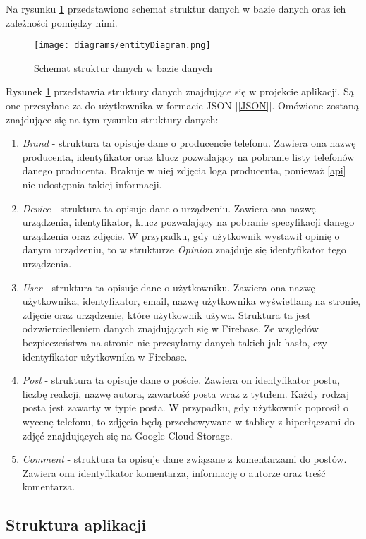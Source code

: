 Na rysunku \ref{database} przedstawiono schemat struktur danych w bazie danych oraz ich zależności pomiędzy nimi.

\begin{figure}[H]
    \centering
    \texttt{[image: diagrams/entityDiagram.png]}
    \caption{Schemat struktur danych w bazie danych}
    \label{database}
\end{figure}
Rysunek \ref{database} przedstawia struktury danych znajdujące się w projekcie aplikacji. Są one przesyłane za do użytkownika w formacie JSON |\ref{JSON}|. Omówione zostaną znajdujące się na tym rysunku struktury danych:
\begin{enumerate}
    \item \textit{Brand} - struktura ta opisuje dane o producencie telefonu. Zawiera ona nazwę producenta, identyfikator oraz klucz pozwalający na pobranie listy telefonów danego producenta. Brakuje w niej zdjęcia loga producenta, ponieważ \ref{api} nie udostępnia takiej informacji.
    \item \textit{Device} - struktura ta opisuje dane o urządzeniu. Zawiera ona nazwę urządzenia, identyfikator, klucz pozwalający na pobranie specyfikacji danego urządzenia oraz zdjęcie. W przypadku, gdy użytkownik wystawił opinię o danym urządzeniu, to w strukturze \textit{Opinion} znajduje się identyfikator tego urządzenia.
    \item \textit{User} - struktura ta opisuje dane o użytkowniku. Zawiera ona nazwę użytkownika, identyfikator, email, nazwę użytkownika wyświetlaną na stronie, zdjęcie oraz urządzenie, które użytkownik używa. Struktura ta jest odzwierciedleniem danych znajdujących się w Firebase. Ze względów bezpieczeństwa na stronie nie przesyłamy danych takich jak hasło, czy identyfikator użytkownika w Firebase.
    \item \textit{Post} - struktura ta opisuje dane o poście. Zawiera on identyfikator postu, liczbę reakcji, nazwę autora, zawartość posta wraz z tytułem. Każdy rodzaj posta jest zawarty w typie posta. W przypadku, gdy użytkownik poprosił o wycenę telefonu, to zdjęcia będą przechowywane w tablicy z hiperłączami do zdjęć znajdujących się na Google Cloud Storage.
    \item \textit{Comment} - struktura ta opisuje dane związane z komentarzami do postów. Zawiera ona identyfikator komentarza, informację o autorze oraz treść komentarza.
\end{enumerate}

\subsection{Struktura aplikacji}
